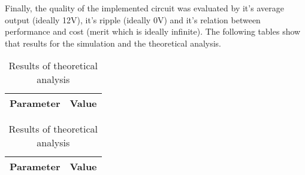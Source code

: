 \newpage
Finally, the quality of the implemented circuit was evaluated by it's average output (ideally 12V), it's ripple (ideally 0V) and it's relation between performance and cost (merit which is ideally infinite). The following tables show that results for the simulation and the theoretical analysis.


\begin{table}[!htb]
  \begin{minipage}{.5\linewidth}
     \centering
  \begin{tabular}{|c|c|}
    \hline    
    {\bf Parameter} & {\bf Value} \\ \hline
    
 \end{tabular}
 \caption{Results of simulation analysis}
 \label{tab:sim}
  \end{minipage}%
    \hspace{2 mm}
    \begin{minipage}{.5\linewidth}
      \centering
        \begin{tabular}{|c|c|}
    \hline    
    {\bf Parameter} & {\bf Value} \\ \hline
    
 \end{tabular}
        \caption{Results of theoretical analysis}
        \label{comppar}
    \end{minipage} 
\end{table}



\newpage

